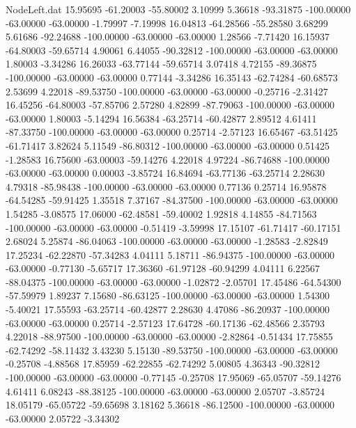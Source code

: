 \begin{filecontents}{NodeLeft.dat}
  15.95695  -61.20003  -55.80002     3.10999    5.36618  -93.31875 -100.00000  -63.00000  -63.00000   -1.79997   -7.19998
  16.04813  -64.28566  -55.28580     3.68299    5.61686  -92.24688 -100.00000  -63.00000  -63.00000    1.28566   -7.71420
  16.15937  -64.80003  -59.65714     4.90061    6.44055  -90.32812 -100.00000  -63.00000  -63.00000    1.80003   -3.34286
  16.26033  -63.77144  -59.65714     3.07418    4.72155  -89.36875 -100.00000  -63.00000  -63.00000    0.77144   -3.34286
  16.35143  -62.74284  -60.68573     2.53699    4.22018  -89.53750 -100.00000  -63.00000  -63.00000   -0.25716   -2.31427
  16.45256  -64.80003  -57.85706     2.57280    4.82899  -87.79063 -100.00000  -63.00000  -63.00000    1.80003   -5.14294
  16.56384  -63.25714  -60.42877     2.89512    4.61411  -87.33750 -100.00000  -63.00000  -63.00000    0.25714   -2.57123
  16.65467  -63.51425  -61.71417     3.82624    5.11549  -86.80312 -100.00000  -63.00000  -63.00000    0.51425   -1.28583
  16.75600  -63.00003  -59.14276     4.22018    4.97224  -86.74688 -100.00000  -63.00000  -63.00000    0.00003   -3.85724
  16.84694  -63.77136  -63.25714     2.28630    4.79318  -85.98438 -100.00000  -63.00000  -63.00000    0.77136    0.25714
  16.95878  -64.54285  -59.91425     1.35518    7.37167  -84.37500 -100.00000  -63.00000  -63.00000    1.54285   -3.08575
  17.06000  -62.48581  -59.40002     1.92818    4.14855  -84.71563 -100.00000  -63.00000  -63.00000   -0.51419   -3.59998
  17.15107  -61.71417  -60.17151     2.68024    5.25874  -86.04063 -100.00000  -63.00000  -63.00000   -1.28583   -2.82849
  17.25234  -62.22870  -57.34283     4.04111    5.18711  -86.94375 -100.00000  -63.00000  -63.00000   -0.77130   -5.65717
  17.36360  -61.97128  -60.94299     4.04111    6.22567  -88.04375 -100.00000  -63.00000  -63.00000   -1.02872   -2.05701
  17.45486  -64.54300  -57.59979     1.89237    7.15680  -86.63125 -100.00000  -63.00000  -63.00000    1.54300   -5.40021
  17.55593  -63.25714  -60.42877     2.28630    4.47086  -86.20937 -100.00000  -63.00000  -63.00000    0.25714   -2.57123
  17.64728  -60.17136  -62.48566     2.35793    4.22018  -88.97500 -100.00000  -63.00000  -63.00000   -2.82864   -0.51434
  17.75855  -62.74292  -58.11432     3.43230    5.15130  -89.53750 -100.00000  -63.00000  -63.00000   -0.25708   -4.88568
  17.85959  -62.22855  -62.74292     5.00805    4.36343  -90.32812 -100.00000  -63.00000  -63.00000   -0.77145   -0.25708
  17.95069  -65.05707  -59.14276     4.61411    6.08243  -88.38125 -100.00000  -63.00000  -63.00000    2.05707   -3.85724
  18.05179  -65.05722  -59.65698     3.18162    5.36618  -86.12500 -100.00000  -63.00000  -63.00000    2.05722   -3.34302

\end{filecontents}
